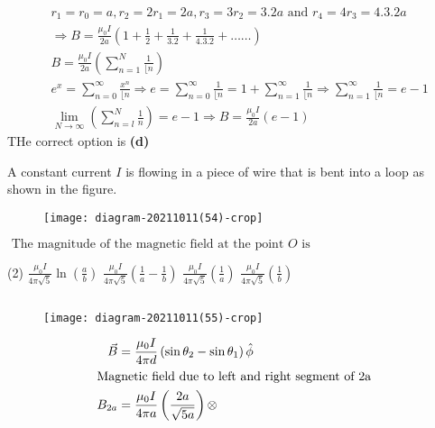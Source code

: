 \begin{enumerate}
\begin{answer}
\begin{align*}
	&r_{1}=r_{0}=a, r_{2}=2 r_{1}=2 a, r_{3}=3 r_{2}=3.2 a \text { and } r_{4}=4 r_{3}=4.3 .2 a \\
	&\Rightarrow B=\frac{\mu_{0} I}{2 a}\left(1+\frac{1}{2}+\frac{1}{3.2}+\frac{1}{4.3 .2}+\ldots \ldots\right) \\
	&B=\frac{\mu_{0} I}{2 a}\left(\sum_{n=1}^{N} \frac{1}{\lfloor n}\right) \\
	&e^{x}=\sum_{n=0}^{\infty} \frac{x^{n}}{\lfloor n} \Rightarrow e=\sum_{n=0}^{\infty} \frac{1}{\lfloor n}=1+\sum_{n=1}^{\infty} \frac{1}{\lfloor n} \Rightarrow \sum_{n=1}^{\infty} \frac{1}{\lfloor n}=e-1 \\
	&\lim _{N \rightarrow \infty}\left(\sum_{n=l}^{N} \frac{1}{n}\right)=e-1 \Rightarrow B=\frac{\mu_{0} I}{2 a}(e-1)
	\end{align*}	
	THe correct option is \textbf{(d)}
\end{answer}
\begin{minipage}{\textwidth}
	\item A constant current $I$ is flowing in a piece of wire that is bent into a loop as shown in the figure.\\
	\begin{figure}[H]
		\centering
		\texttt{[image: diagram-20211011(54)-crop]}
	\end{figure}
	$\text { The magnitude of the magnetic field at the point } O \text { is }$
\end{minipage}
\begin{tasks}(2)
	\task[\textbf{A.}] $\frac{\mu_{0} I}{4 \pi \sqrt{5}} \ln \left(\frac{a}{b}\right)$
	\task[\textbf{B.}]$\frac{\mu_{0} I}{4 \pi \sqrt{5}}\left(\frac{1}{a}-\frac{1}{b}\right)$
	\task[\textbf{C.}]$\frac{\mu_{0} I}{4 \pi \sqrt{5}}\left(\frac{1}{a}\right)$
	\task[\textbf{D.}]$\frac{\mu_{0} I}{4 \pi \sqrt{5}}\left(\frac{1}{b}\right)$
\end{tasks}
\begin{answer}$\left. \right. $\\
	\begin{figure}[H]
		\centering
		\texttt{[image: diagram-20211011(55)-crop]}
	\end{figure}
	\begin{align*}
	\vec{B}&=\frac{\mu_{0} I}{4 \pi d}\left(\sin \theta_{2}-\sin \theta_{1}\right) \hat{\phi}\\
	\intertext{Magnetic field due to left and right segment of 2a}
	B_{2 a}&=\frac{\mu_{0} I}{4 \pi a}\left(\frac{2 a}{\sqrt{5 a}}\right) \otimes\\

\end{align*}
\end{answer}
\end{enumerate}
